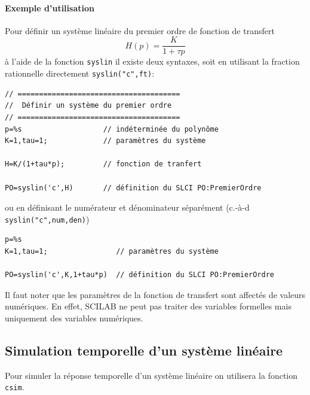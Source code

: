 \paragraph{Exemple d'utilisation}
Pour définir un système linéaire du premier ordre de fonction de transfert
$$
H(p)=\dfrac{K}{1+\tau p}
$$
à l'aide de la fonction \verb?syslin? il existe deux syntaxes, soit en utilisant 
la fraction rationnelle directement \verb?syslin("c",ft)?:
\begin{code}
\begin{verbatim}
// ======================================
//  Définir un système du premier ordre
// ======================================
p=%s                   // indéterminée du polynôme
K=1,tau=1;             // paramètres du système

H=K/(1+tau*p);         // fonction de tranfert

PO=syslin('c',H)       // définition du SLCI PO:PremierOrdre
\end{verbatim}
\end{code}
ou en définisant le numérateur et dénominateur séparément (c.-à-d \verb?syslin("c",num,den)?)
\begin{code}
\begin{verbatim}
p=%s
K=1,tau=1;                // paramètres du système

PO=syslin('c',K,1+tau*p)  // définition du SLCI PO:PremierOrdre
\end{verbatim}
\end{code}

Il faut noter que les paramètres de la fonction de transfert sont affectés de valeurs
numériques. En effet, SCILAB ne peut pas traiter des variables formelles mais uniquement
des variables \og numériques\fg.

\subsection{Simulation temporelle d'un système linéaire}
Pour simuler la réponse temporelle d'un système linéaire on utilisera la fonction 
\verb?csim?.

